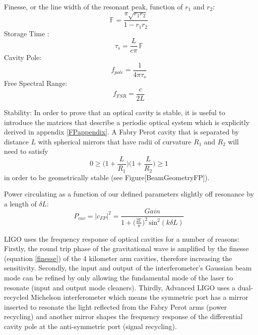 		Finesse, or the line width of the resonant peak, function of $r_1$ and $r_2$:
		\begin{equation}\label{finesse}
		\mathbb{F} = \frac{\pi \sqrt{r_1 r_2}}{1- r_1 r_2}
		\end{equation}
		Storage Time :
		\begin{equation}
		\tau_{s} = \frac{L}{c \pi} \, \mathbb{F}
		\end{equation}
		Cavity Pole:
		\begin{equation}
		f_{pole} = \frac{1}{4\pi \tau_{s}}
		\end{equation}
		Free Spectral Range:
		\begin{equation}
		f_{FSR}  = \frac{c}{2L}
		\end{equation}

		Stability: In order to prove that an optical cavity is stable, it is useful to introduce the matrices that describe a periodic optical system which is explicitly derived in appendix \ref{FPappendix}.  A Fabry Perot cavity that is separated by distance $L$ with spherical mirrors that have radii of curvature $R_1$ and $R_2$ will need to satisfy 
		\begin{equation}\label{gfactor}
		0 \geq \bigg(1+\frac{L}{R_1}\bigg) \bigg(1+\frac{L}{R_2}\bigg) \geq 1
		\end{equation}
		in order to be geometrically stable (see Figure[BeamGeometryFP]).
		
		Power circulating as a function of our defined parameters slightly off resonance by a length of $\delta L$:
		\begin{equation}
		P_{cav} = \vert c_{FP} \vert^2 = \frac{Gain}{ 1 + \big(\frac{2\mathbb{F}}{\pi} \big)^2 \, \text{sin}^2(k \delta L) }
		\end{equation}
		
		LIGO uses the frequency response of optical cavities for a number of reasons: Firstly, the round trip phase of the gravitational wave is amplified by the finesse (equation \ref{finesse}) of the 4 kilometer arm cavities, therefore increasing the sensitivity.  Secondly, the input and output of the interferometer's Gaussian beam mode can be refined by only allowing the fundamental mode of the laser to resonate (input and output mode cleaners).  Thirdly, Advanced LIGO uses a dual-recycled Michelson interferometer which means the symmetric port has a mirror inserted to resonate the light reflected from the Fabry Perot arms (power recycling) and another mirror shapes the frequency response of the differential cavity pole at the anti-symmetric port (signal recycling).
